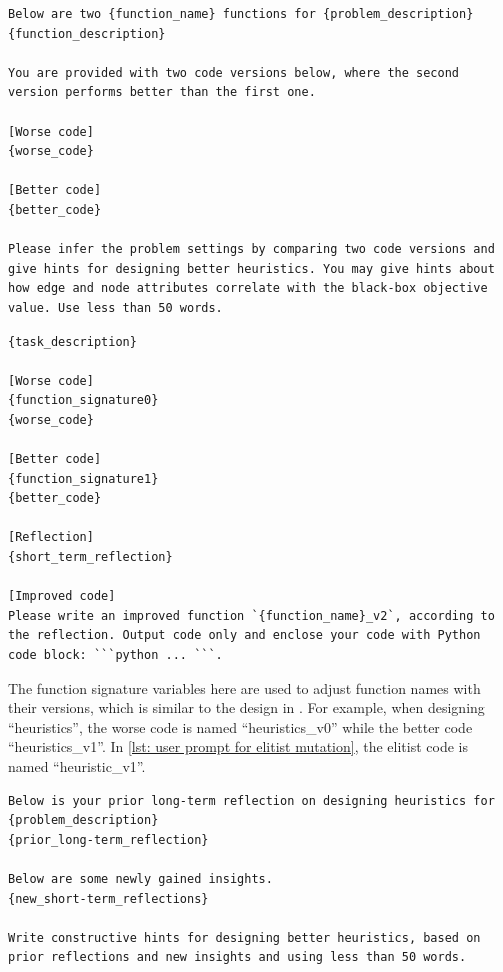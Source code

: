 \begin{lstlisting}[caption={User prompt for short-term reflection on black-box COPs.},  label={lst: user prompt for short-term reflection on black-box COPs}, style=promptstyle]
Below are two {function_name} functions for {problem_description}
{function_description}

You are provided with two code versions below, where the second version performs better than the first one.

[Worse code]
{worse_code}

[Better code]
{better_code}

Please infer the problem settings by comparing two code versions and give hints for designing better heuristics. You may give hints about how edge and node attributes correlate with the black-box objective value. Use less than 50 words.
\end{lstlisting}


\begin{lstlisting}[caption={User prompt for crossover.},  label={lst: user prompt for crossover}, style=promptstyle]
{task_description}

[Worse code]
{function_signature0}
{worse_code}

[Better code]
{function_signature1}
{better_code}

[Reflection]
{short_term_reflection}

[Improved code]
Please write an improved function `{function_name}_v2`, according to the reflection. Output code only and enclose your code with Python code block: ```python ... ```.
\end{lstlisting}

The function signature variables here are used to adjust function names with their versions, which is similar to the design in \cite{romera2023funsearch}. For example, when designing ``heuristics'', the worse code is named ``heuristics\_v0'' while the better code ``heuristics\_v1''. In \cref{lst: user prompt for elitist mutation}, the elitist code is named ``heuristic\_v1''.

\begin{lstlisting}[caption={User prompt for long-term reflection.},  label={lst: user prompt for long-term reflection}, style=promptstyle]
Below is your prior long-term reflection on designing heuristics for {problem_description}
{prior_long-term_reflection}

Below are some newly gained insights.
{new_short-term_reflections}

Write constructive hints for designing better heuristics, based on prior reflections and new insights and using less than 50 words.
\end{lstlisting}

